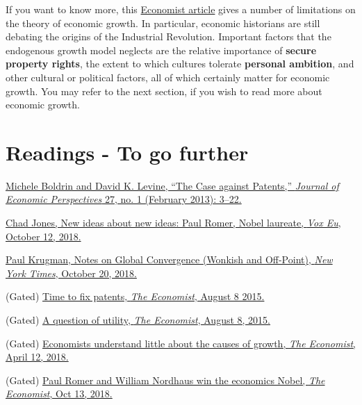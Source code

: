 \documentclass[]{book}
\theoremstyle{definition}
\theoremstyle{definition}
\theoremstyle{definition}
\theoremstyle{remark}
\begin{document}
If you want to know more, this
\href{https://www.economist.com/finance-and-economics/2018/04/12/economists-understand-little-about-the-causes-of-growth}{Economist
article} gives a number of limitations on the theory of economic growth.
In particular, economic historians are still debating the origins of the
Industrial Revolution. Important factors that the endogenous growth
model neglects are the relative importance of \textbf{secure property
rights}, the extent to which cultures tolerate \textbf{personal
ambition}, and other cultural or political factors, all of which
certainly matter for economic growth. You may refer to the next section,
if you wish to read more about economic growth.

\section*{Readings - To go further}\label{readings---to-go-further-4}

\href{https://doi.org/10.1257/jep.27.1.3}{Michele Boldrin and David K.
Levine, ``The Case against Patents,'' \emph{Journal of Economic
Perspectives} 27, no. 1 (February 2013): 3--22.}

\href{https://voxeu.org/article/new-ideas-about-new-ideas-paul-romer-nobel-laureate}{Chad
Jones, New ideas about new ideas: Paul Romer, Nobel laureate, \emph{Vox
Eu}, October 12, 2018.}

\href{https://search.proquest.com/docview/2123033147/1417E92D94B43EFPQ/3?accountid=14512}{Paul
Krugman, Notes on Global Convergence (Wonkish and Off-Point), \emph{New
York Times}, October 20, 2018.}

(Gated)
\href{https://www.economist.com/news/leaders/21660522-ideas-fuel-economy-todays-patent-systems-are-rotten-way-rewarding-them-time-fix}{Time
to fix patents, \emph{The Economist}, August 8 2015.}

(Gated)
\href{https://www.economist.com/international/2015/08/08/a-question-of-utility}{A
question of utility, \emph{The Economist}, August 8, 2015.}

(Gated)
\href{https://www.economist.com/finance-and-economics/2018/04/12/economists-understand-little-about-the-causes-of-growth}{Economists
understand little about the causes of growth, \emph{The Economist},
April 12, 2018.}

(Gated)
\href{https://www.economist.com/finance-and-economics/2018/10/13/paul-romer-and-william-nordhaus-win-the-economics-nobel?fsrc=scn/fb/te/bl/ed/paulromerandwilliamnordhauswintheeconomicsnobelfreeexchange}{Paul
Romer and William Nordhaus win the economics Nobel, \emph{The
Economist}, Oct 13, 2018.}
\end{document}
